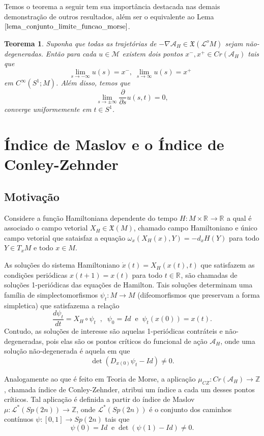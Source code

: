 \documentclass[12pt]{book}
\newtheorem{teorema}{Teorema}[section]
\newcommand{\caminhosespeciais}[1]{\mathcal{L}^{*}(#1)}
\newcommand{\campohamiltoniano}[1]{X_{H}(#1)}
\newcommand{\campohamiltonianoabrev}{X_{H}}
\newcommand{\campossuaves}[1]{\mathfrak{X}(#1)}
\newcommand{\circulo}{S^{1}}
\newcommand{\derivada}[2]{\frac{d #1}{d #2}}
\newcommand{\derivadaparcial}[2]{\frac{\partial #1}{\partial #2}}
\newcommand{\energiafinitaM}{\mathcal{M}}
\newcommand{\espacotangenteponto}[2]{T_{#1}#2}
\newcommand{\funcionalH}{\mathcal{A}_{H}}
\newcommand{\gradientefuncional}{\nabla \funcionalH}
\newcommand{\gruposimpletico}[1]{Sp(#1)}
\newcommand{\iconleyabrev}{\mu_{CZ}}
\newcommand{\inteiros}{\mathbb{Z}}
\newcommand{\intervalo}{[0,1]}
\newcommand{\pontoscriticos}[1]{\textit{Cr}(#1)}
\newcommand{\real}[1]{\mathbb{R}^{#1}}
\newcommand{\reta}{\real{}}
\newcommand{\lacocontrateis}{\mathcal{L}^{o}M}
\begin{document}
	Temos o teorema a seguir tem sua importância destacada nas demais demonstração de outros resultados, além ser o equivalente ao Lema $\ref{lema_conjunto_limite_funcao_morse}$.
	
	\begin{teorema}\label{teorema_limite_solucoes_energia_finita}
		Suponha que todas as trajetórias de $-\gradientefuncional \in \campossuaves{\lacocontrateis}$ sejam não-degeneradas. Então para cada $u \in \energiafinitaM$ existem dois pontos $x^{-}, x^{+}\in \pontoscriticos{\funcionalH}$ tais que
		$$
		\lim_{s\to -\infty}u(s)=x^{-},\; \lim_{s\to \infty}u(s)=x^{+}\;\;
		$$
		em $C^{\infty}(\circulo;M)$. Além disso, temos que
		$$
		\lim_{s\to \pm \infty}\derivadaparcial{}{s}u(s,t) = 0,
		$$
		converge uniformemente em $t\in \circulo$.
	\end{teorema}
	
	\chapter{Índice de Maslov e o Índice de Conley-Zehnder}
	\section{Motivação}
	Considere a função Hamiltoniana dependente do tempo $H:M\times \reta\to \reta$ a qual é associado o campo vetorial $X_{H} \in \campossuaves{M}$, chamado campo Hamiltoniano e único campo vetorial que sataisfaz a equação $\omega_{x}(\campohamiltoniano{x}, Y) = -d_{x}H(Y)$ para todo $Y \in \espacotangenteponto{x}{M}$ e todo $x \in M$. 
	
	As soluções do sistema Hamiltoniano $\dot{x}(t) = X_{H}(x(t), t)$ que satisfazem as condições periódicas $x(t+1) = x(t)$ para todo $t\in \reta$, são chamadas de soluções 1-periódicas das equações de Hamilton. Tais soluções determinam uma família de simplectomorfismos $\psi_{t}:M \to M$ (difeomorfismos que preservam a forma simpletica) que satisfazema a relação 
	$$
	\derivada{\psi_{t}}{t}=\campohamiltonianoabrev\circ\psi_{t} \;\;, \;\; \psi_{0}=Id \;\;\text{e}\;\;  \psi_{t}(x(0)) = x(t).
	$$
	Contudo, as soluções de interesse são aquelas 1-periódicas contráteis e não-degeneradas, pois elas são os pontos críticos do funcional de ação $\funcionalH$, onde uma solução não-degenerada é aquela em que 
	$$
	\det(D_{x(0)}\psi_{t} -Id)\neq 0.
	$$
	
	
	Analogamente ao que é feito em Teoria de Morse, a aplicação $\iconleyabrev:\pontoscriticos{\funcionalH} \to \inteiros$, chamada índice de Conley-Zehnder, atribui um índice a cada um desses pontos críticos. Tal aplicação é definida a partir do índice de Maslov $\mu:\caminhosespeciais{\gruposimpletico{2n}} \to \inteiros$, onde $\caminhosespeciais{\gruposimpletico{2n}}$ é o conjunto dos caminhos contínuos $\psi:\intervalo \to \gruposimpletico{2n}$ tais que 
	$$
	\psi(0)=Id\;\;\text{e}\;\det(\psi(1)-Id)\neq 0.
	$$
	
\end{document}
